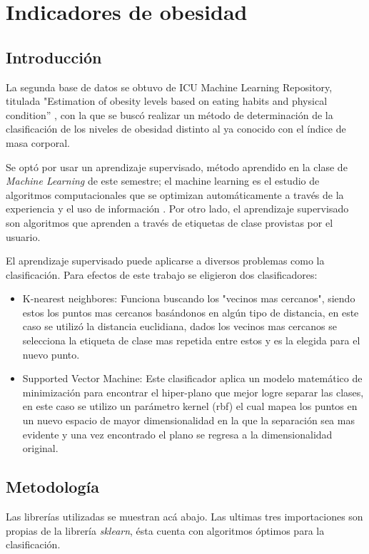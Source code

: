 \documentclass{article}
\begin{document}
\clearpage
\section{Indicadores de obesidad}

\subsection{Introducción}
La segunda base de datos se obtuvo de ICU Machine Learning Repository, titulada "Estimation of obesity levels based on eating habits and physical condition'' \cite{obs}, con la que se buscó realizar un método de determinación de la clasificación de los niveles de obesidad distinto al ya conocido con el índice de masa corporal.

Se optó por usar un aprendizaje supervisado, método aprendido en la clase de \textit{Machine Learning} de este semestre; el machine learning es el estudio de algoritmos computacionales que se optimizan automáticamente a través de la experiencia y el uso de información \cite{lib}. Por otro lado, el aprendizaje supervisado son algoritmos que aprenden a través de etiquetas de clase provistas por el usuario.

El aprendizaje supervisado puede aplicarse a diversos problemas como la clasificación. Para efectos de este trabajo se eligieron dos clasificadores:
\begin{itemize}
    \item K-nearest neighbores: Funciona buscando los "vecinos mas cercanos", siendo estos los puntos mas cercanos basándonos en algún tipo de distancia, en este caso se utilizó la distancia euclidiana, dados los vecinos mas cercanos se selecciona la etiqueta de clase mas repetida entre estos y es la elegida para el nuevo punto.
    \item Supported Vector Machine: Este clasificador aplica un modelo matemático de minimización para encontrar el hiper-plano que mejor logre separar las clases, en este caso se utilizo un parámetro kernel (rbf) el cual mapea los puntos en un nuevo espacio de mayor dimensionalidad en la que la separación sea mas evidente y una vez encontrado el plano se regresa a la dimensionalidad original.
\end{itemize}

\subsection{Metodología}
Las librerías utilizadas se muestran acá abajo. Las ultimas tres importaciones son propias de la librería \textit{sklearn}, ésta cuenta con algoritmos óptimos para la clasificación.
\end{document}
